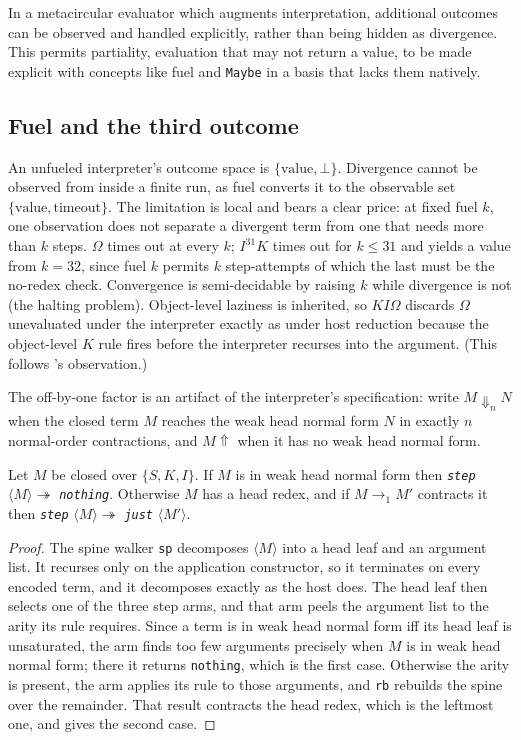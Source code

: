 \documentclass[review]{jfp-epi}
\begin{document}
In a metacircular evaluator which augments interpretation,
additional outcomes can be observed and handled explicitly, rather than
being hidden as divergence.  This permits partiality, evaluation that may not return a value, to be
made explicit with concepts like fuel and \texttt{Maybe} in a basis that
lacks them natively.

\subsection{Fuel and the third outcome}\label{sec:fuel}

An unfueled interpreter's outcome space is $\{\text{value},
\bot\}$. Divergence cannot be observed from inside a
finite run, as fuel converts it to the observable set $\{\text{value},
\text{timeout}\}$. The limitation is local and bears a clear
price: at fixed fuel $k$, one observation does not separate a divergent
term from one that needs more than $k$ steps. $\Omega$ times out at
every $k$; $I^{31}K$ times out for $k \le 31$ and yields a value from
$k = 32$, since fuel $k$ permits $k$ step-attempts of which the last
must be the no-redex check. Convergence is semi-decidable by raising
$k$ while divergence is not (the halting problem). Object-level laziness
is inherited, so $KI\Omega$ discards $\Omega$ unevaluated under the
interpreter exactly as under host reduction because the object-level $K$
rule fires before the interpreter recurses into the argument.  (This
follows \citeauthor{Reynolds1972}'s observation.)

The off-by-one factor is an artifact of the interpreter's specification:
write $M \Downarrow_n N$ when the closed term $M$ reaches the weak
head normal form $N$ in exactly $n$ normal-order contractions, and $M
\Uparrow$ when it has no weak head normal form.

\begin{lemma}\label{lem:step}
Let $M$ be closed over $\{S,K,I\}$.  If $M$ is in weak head normal form
then \emph{\texttt{step}} $\langle M\rangle \twoheadrightarrow$
\emph{\texttt{nothing}}.  Otherwise $M$ has a head redex, and if
\mbox{$M \to_1 M'$} contracts it then \emph{\texttt{step}} $\langle
M\rangle \twoheadrightarrow$ \emph{\texttt{just}} $\langle M'\rangle$.
\end{lemma}

\begin{proof}
The spine walker \texttt{sp} decomposes $\langle M \rangle$ into a head
leaf and an argument list.  It recurses only on the application
constructor, so it terminates on every encoded term, and it decomposes
exactly as the host does.  The head leaf then selects one of the three
step arms, and that arm peels the argument list to the arity its rule
requires.  Since a term is in weak head normal form iff its head leaf is
unsaturated, the arm finds too few arguments precisely when $M$ is in
weak head normal form; there it returns \texttt{nothing}, which is the
first case.  Otherwise the arity is present, the arm applies its rule to
those arguments, and \texttt{rb} rebuilds the spine over the remainder.
That result contracts the head redex, which is the leftmost one, and
gives the second case.
\end{proof}
\end{document}
